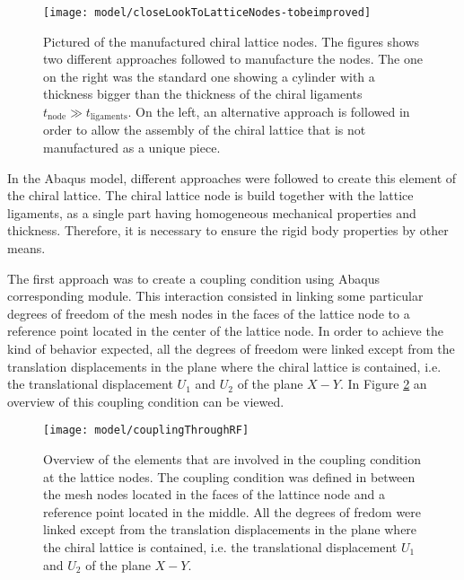 \begin{figure}[!htpb]
  \centering
  \texttt{[image: model/closeLookToLatticeNodes-tobeimproved]}
  \caption[Pictured of the manufactured chiral lattice nodes]{Pictured of the manufactured chiral lattice nodes. The figures shows two different approaches followed to manufacture the nodes. The one on the right was the standard one showing a cylinder with a thickness bigger than the thickness of the chiral ligaments $t_{\mathrm{node}} \gg t_{\mathrm{ligaments}}$. On the left, an alternative approach is followed in order to allow the assembly of the chiral lattice that is not manufactured as a unique piece. \cite{Vincenz2017}}\label{fig:closeLookToLatticeNodes}
\end{figure}

In the Abaqus model, different approaches were followed to create this element of the chiral lattice. The chiral lattice node is build together with the lattice ligaments, as a single part having homogeneous mechanical properties and thickness. Therefore, it is necessary to ensure the rigid body properties by other means.

The first approach was to create a coupling condition using Abaqus corresponding module. This interaction consisted in linking some particular degrees of freedom of the mesh nodes in the faces of the lattice node to a reference point located in the center of the lattice node. In order to achieve the kind of behavior expected, all the degrees of freedom were linked except from the translation displacements in the plane where the chiral lattice is contained, i.e. the translational displacement $U_1$ and $U_2$ of the plane $X-Y$. In Figure \ref{fig:couplingThroughRF} an overview of this coupling condition can be viewed.

\begin{figure}[!htpb]
  \centering
  \texttt{[image: model/couplingThroughRF]}
  \caption[Overview of the elements that are involved in the coupling condition at the lattice nodes]{Overview of the elements that are involved in the coupling condition at the lattice nodes. The coupling condition was defined in between the mesh nodes located in the faces of the lattince node and a reference point located in the middle. All the degrees of fredom were linked except from the translation displacements in the plane where the chiral lattice is contained, i.e. the translational displacement $U_1$ and $U_2$ of the plane $X-Y$.}\label{fig:couplingThroughRF}
\end{figure}

